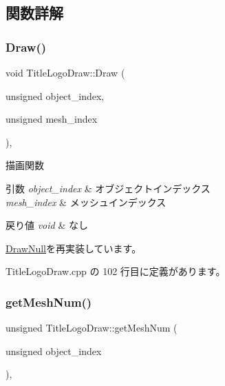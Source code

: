 \subsection{関数詳解}
\mbox{\label{class_title_logo_draw_a01e4cb21d580bac86a226fa2e35bf4a3}} 
\subsubsection{\texorpdfstring{Draw()}{Draw()}}
{\footnotesize\ttfamily void Title\+Logo\+Draw\+::\+Draw (\begin{DoxyParamCaption}\item[{unsigned}]{object\+\_\+index,  }\item[{unsigned}]{mesh\+\_\+index }\end{DoxyParamCaption})\hspace{0.3cm}{\ttfamily [override]}, {\ttfamily [virtual]}}



描画関数 


\begin{DoxyParams}{引数}
{\em object\+\_\+index} & オブジェクトインデックス \\
\hline
{\em mesh\+\_\+index} & メッシュインデックス \\
\hline
\end{DoxyParams}

\begin{DoxyRetVals}{戻り値}
{\em void} & なし \\
\hline
\end{DoxyRetVals}


\mbox{\hyperlink{class_draw_null_a72ac0b7dc40b1469582419dcc5b0e114}{Draw\+Null}}を再実装しています。



 Title\+Logo\+Draw.\+cpp の 102 行目に定義があります。

\mbox{\label{class_title_logo_draw_a20a0e0c3569e49eb421ab4b5a65777cd}} 
\subsubsection{\texorpdfstring{get\+Mesh\+Num()}{getMeshNum()}}
{\footnotesize\ttfamily unsigned Title\+Logo\+Draw\+::get\+Mesh\+Num (\begin{DoxyParamCaption}\item[{unsigned}]{object\+\_\+index }\end{DoxyParamCaption})\hspace{0.3cm}{\ttfamily [override]}, {\ttfamily [virtual]}}



